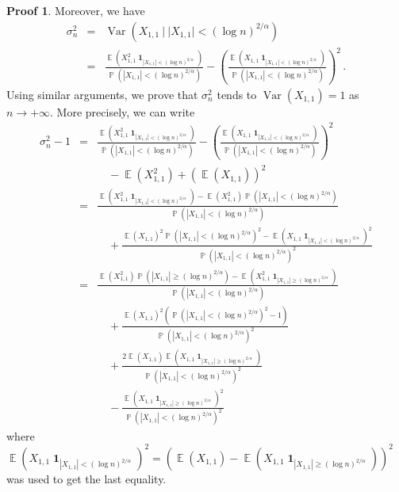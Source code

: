 \documentclass[11pt,a4paper]{article}
\DeclareMathOperator{\E}{\mathbb{E}}
\DeclareMathOperator{\PR}{\mathbb{P}}
\DeclareMathOperator{\1}{\mathbf{1}}
\DeclareMathOperator{\Var}{\mathrm{Var}}
\theoremstyle{definition}
\newtheorem*{Proof}{Proof}
\begin{document}
\begin{Proof}
Moreover, we have
\begin{eqnarray*}
\sigma_n^2 & = & \Var( X_{1,1} \ | \ |X_{1,1}| < (\log n)^{2/\alpha} ) \\
& = & \frac{\E \left( X_{1,1}^2 \1_{|X_{1,1}| < (\log n)^{2/\alpha}} \right)}{\PR(|X_{1,1}| < (\log n)^{2/\alpha})} - \left( \frac{\E \left( X_{1,1} \1_{|X_{1,1}| < (\log n)^{2/\alpha}} \right)}{\PR(|X_{1,1}| < (\log n)^{2/\alpha})} \right)^2 \, .
\end{eqnarray*}
Using similar arguments, we prove that $\sigma_n^2$ tends to $\Var(X_{1,1})=1$ as $n \to +\infty$. More precisely, we can write
\begin{eqnarray} \label{exp_equiv_eq3bis}
\sigma_n^2-1 & = & \frac{\E \left( X_{1,1}^2 \1_{|X_{1,1}| < (\log n)^{2/\alpha}} \right)}{\PR \left( |X_{1,1}| < (\log n)^{2/\alpha} \right)} - \left( \frac{\E \left( X_{1,1} \1_{|X_{1,1}| < (\log n)^{2/\alpha}} \right)}{\PR \left( |X_{1,1}| < (\log n)^{2/\alpha} \right)} \right)^2 \nonumber \\
& & \quad - \E(X_{1,1}^2) + (\E(X_{1,1}))^2 \nonumber \\
& = & \frac{\E \left( X_{1,1}^2 \1_{|X_{1,1}| < (\log n)^{2/\alpha}} \right) - \E(X_{1,1}^2) \PR \left( |X_{1,1}| < (\log n)^{2/\alpha} \right)}{\PR \left( |X_{1,1}| < (\log n)^{2/\alpha} \right)} \nonumber \\
& & \quad + \frac{\E(X_{1,1})^2 \PR \left( |X_{1,1}| < (\log n)^{2/\alpha} \right)^2 - \E \left( X_{1,1} \1_{|X_{1,1}| < (\log n)^{2/\alpha}} \right)^2}{\PR \left( |X_{1,1}| < (\log n)^{2/\alpha} \right)^2} \nonumber \\
& = & \frac{\E(X_{1,1}^2) \PR \left( |X_{1,1}| \ge (\log n)^{2/\alpha} \right) - \E \left( X_{1,1}^2 \1_{|X_{1,1}| \ge (\log n)^{2/\alpha}} \right)}{\PR \left( |X_{1,1}| < (\log n)^{2/\alpha} \right)} \nonumber \\
& & \quad + \frac{\E(X_{1,1})^2 \left( \PR \left( |X_{1,1}| < (\log n)^{2/\alpha} \right)^2 - 1 \right)}{\PR \left( |X_{1,1}| < (\log n)^{2/\alpha} \right)^2} \nonumber \\
& & \quad + \frac{2 \E(X_{1,1}) \E \left( X_{1,1} \1_{|X_{1,1}| \ge (\log n)^{2/\alpha}} \right)}{\PR \left( |X_{1,1}| < (\log n)^{2/\alpha} \right)^2} \nonumber \\
& & \quad - \frac{\E \left( X_{1,1} \1_{|X_{1,1}| \ge (\log n)^{2/\alpha}} \right)^2}{\PR \left( |X_{1,1}| < (\log n)^{2/\alpha} \right)^2}
\end{eqnarray}
where $\E \left( X_{1,1} \1_{|X_{1,1}| < (\log n)^{2/\alpha}} \right)^2 = \left( \E(X_{1,1}) - \E \left( X_{1,1} \1_{|X_{1,1}| \ge (\log n)^{2/\alpha}} \right) \right)^2$ was used to get the last equality.\\

\end{Proof}
\end{document}
